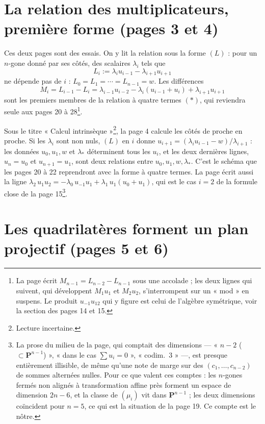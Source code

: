 \documentclass[11pt,a4paper]{article}
\begin{document}
\section*{La relation des multiplicateurs, première forme (pages 3 et 4)}

Ces deux pages sont des essais. On y lit la relation sous la forme $(L)$ :
pour un $n$-gone donné par ses côtés, des scalaires $\lambda_i$ tels que
\[
  L_i := \lambda_i u_{i-1} - \lambda_{i+1} u_{i+1}
\]
ne dépende pas de $i$ : $L_0 = L_1 = \cdots = L_{n-1} = w$. Les différences
\[
  M_i = L_{i-1} - L_i = \lambda_{i-1} u_{i-2} - \lambda_i (u_{i-1} + u_i)
  + \lambda_{i+1} u_{i+1}
\]
sont les premiers membres de la relation à quatre termes $(\ast)$, qui
reviendra seule aux pages 20 à 28\footnote{La page écrit
$M_{n-1} = L_{n-2} - L_{n-1}$ sous une accolade ; les deux lignes qui suivent,
qui développent $M_1 u_1$ et $M_2 u_2$, s'interrompent sur un « mod » en
suspens. Le produit $u_{-1} u_{12}$ qui y figure est celui de l'algèbre
symétrique, voir la section des pages 14 et 15.}.

Sous le titre « Calcul intrinsèque »\footnote{Lecture incertaine.}, la
page 4 calcule les côtés de proche en proche. Si les $\lambda_i$ sont non nuls,
$(L)$ en $i$ donne $u_{i+1} = (\lambda_i u_{i-1} - w)/\lambda_{i+1}$ : les
données $u_0, u_1, w$ et $\lambda_*$ déterminent tous les $u_i$, et les deux
dernières lignes, $u_n = u_0$ et $u_{n+1} = u_1$, sont deux relations entre
$u_0, u_1, w, \lambda_*$. C'est le schéma que les pages 20 à 22 reprendront
avec la forme à quatre termes. La page écrit aussi la ligne
$\lambda_2 \, u_1 u_2 = -\lambda_0 \, u_{-1} u_1 + \lambda_1 \, u_1 (u_0 + u_1)$,
qui est le cas $i = 2$ de la formule close de la page 15\footnote{La prose du
milieu de la page, qui comptait des dimensions --- « $n-2$
($\subset \mathbf{P}^{n-1}$) », « dans le cas $\sum u_i = 0$ », « codim.~3 »
---, est presque entièrement illisible, de même qu'une note de marge sur des
$(c_1, \ldots, c_{n-2})$ de sommes alternées nulles. Pour ce que valent ces
comptes : les $n$-gones fermés non alignés à transformation affine près forment
un espace de dimension $2n - 6$, et la classe de $(\mu_i)$ vit dans
$\mathbf{P}^{n-1}$ ; les deux dimensions coïncident pour $n = 5$, ce qui est la
situation de la page 19. Ce compte est le nôtre.}.

\section*{Les quadrilatères forment un plan projectif (pages 5 et 6)}
\end{document}
